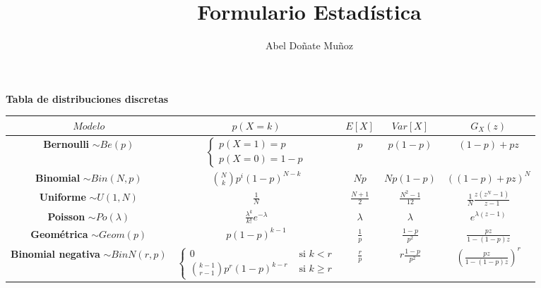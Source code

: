 \documentclass[leqno]{article}
\title{Formulario Estadística}
\author{Abel Doñate Muñoz}
\date{}
\begin{document}
\maketitle
\tableofcontents
\newpage

\textbf{Tabla de distribuciones discretas}
\begin{center}
  \begin{tabular}{|c|c|c|c|c|}
	\hline
	$Modelo$ &  $p(X=k)$ &  $E[X]$ &  $Var[X]$ &  $G_X(z)$ \\
	\hline
	\makecell{\textbf{Bernoulli}\\ $\sim Be(p)$ }  & $\begin{cases}  p(X=1)=p \\  p(X=0) = 1-p \end{cases}$ & $p$ &  $p(1-p)$ &  $(1-p) + pz$ \\
	\hline
	\makecell{\textbf{Binomial}\\ $\sim Bin(N, p)$} & $\displaystyle\binom{N}{k}p^i(1-p)^{N-k}$ & $Np$ &  $Np(1-p)$ &  $((1-p)+pz)^N$ \\
	\hline
	\makecell{\textbf{Uniforme} \\ $\sim U(1, N)$} &  $\displaystyle\frac{1}{N}$ & $\displaystyle\frac{N+1}{2}$ & $\displaystyle\frac{N^2-1}{12}$ & $\displaystyle\frac{1}{N} \frac{z(z^N-1)}{z-1}$ \\
	\hline
	\makecell{\textbf{Poisson} \\ $\sim Po(\lambda)$} & $\displaystyle\frac{\lambda^k}{k!}e^{-\lambda}$ & $\lambda$ & $\lambda$ & $\displaystyle e^{\lambda(z-1)}$ \\
	\hline
	\makecell{\textbf{Geométrica} \\ $\sim Geom(p)$} & $\displaystyle p(1-p)^{k-1}$ &  $\displaystyle\frac{1}{p}$ &  $\displaystyle\frac{1-p}{p^2}$ &  $\displaystyle \frac{pz}{1-(1-p)z}$ \\
	\hline
	\makecell{\textbf{Binomial negativa} \\ $\sim BinN(r, p)$} & $\begin{cases} 0 & \text{ si } k<r \\ \binom{k-1}{r-1}p^r(1-p)^{k-r} & \text{ si } k\ge r \end{cases}$ & $\displaystyle\frac{r}{p}$ & $\displaystyle r \frac{1-p}{p^2}$ & $\displaystyle \left( \frac{pz}{1-(1-p)z} \right)^r $ \\
	\hline
  \end{tabular}
\end{center}
\end{document}
